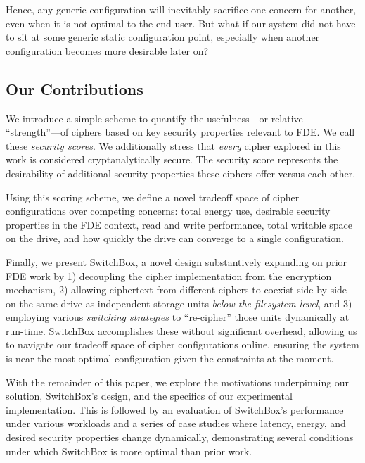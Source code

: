 Hence, any generic configuration will inevitably sacrifice one concern for
another, even when it is not optimal to the end user. But what if our system did
not have to sit at some generic static configuration point, especially when
another configuration becomes more desirable later on?

\subsection{Our Contributions}

We introduce a simple scheme to quantify the usefulness---or relative ``strength''---of 
ciphers based on key security properties relevant to FDE. We call these
\emph{security scores}. We additionally stress that \textit{every} cipher
explored in this work is considered cryptanalytically secure. The security score
represents the desirability of additional security properties these ciphers
offer versus each other. 

Using this scoring scheme, we define a novel tradeoff space of cipher
configurations over competing concerns: total energy use, desirable security
properties in the FDE context, read and write performance, total writable space
on the drive, and how quickly the drive can converge to a single configuration.

Finally, we present SwitchBox, a novel design substantively expanding on prior
FDE work by 1) decoupling the cipher implementation from the encryption
mechanism, 2) allowing ciphertext from different ciphers to coexist side-by-side
on the same drive as independent storage units \textit{below the
filesystem-level}, and 3) employing various \emph{switching strategies} to
``re-cipher'' those units dynamically at run-time. SwitchBox accomplishes these
without significant overhead, allowing us to navigate our tradeoff space of
cipher configurations online, ensuring the system is near the most optimal
configuration given the constraints at the moment.

With the remainder of this paper, we explore the motivations underpinning our
solution, SwitchBox's design, and the specifics of our experimental
implementation. This is followed by an evaluation of SwitchBox's performance
under various workloads and a series of case studies where latency, energy, and
desired security properties change dynamically, demonstrating several conditions
under which SwitchBox is more optimal than prior work.
